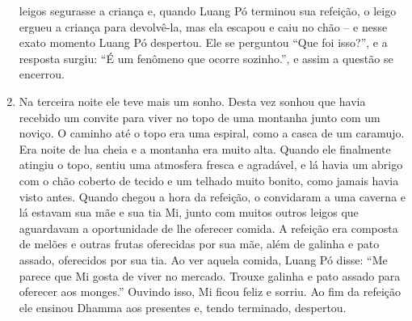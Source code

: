 \begin{enumerate}
  leigos segurasse a criança e, quando Luang Pó terminou sua refeição, o
  leigo ergueu a criança para devolvê-la, mas ela escapou e caiu no chão
  -- e nesse exato momento Luang Pó despertou. Ele se perguntou ``Que
  foi isso?'', e a resposta surgiu: ``É um fenômeno que ocorre
  sozinho.'', e assim a questão se encerrou.
\item
  Na terceira noite ele teve mais um sonho. Desta vez sonhou que havia
  recebido um convite para viver no topo de uma montanha junto com um
  noviço. O caminho até o topo era uma espiral, como a casca de um
  caramujo. Era noite de lua cheia e a montanha era muito alta. Quando
  ele finalmente atingiu o topo, sentiu uma atmosfera fresca e
  agradável, e lá havia um abrigo com o chão coberto de tecido e um
  telhado muito bonito, como jamais havia visto antes. Quando chegou a
  hora da refeição, o convidaram a uma caverna e lá estavam sua mãe e
  sua tia Mi, junto com muitos outros leigos que aguardavam a
  oportunidade de lhe oferecer comida. A refeição era composta de melões
  e outras frutas oferecidas por sua mãe, além de galinha e pato assado,
  oferecidos por sua tia. Ao ver aquela comida, Luang Pó disse: ``Me
  parece que Mi gosta de viver no mercado. Trouxe galinha e pato assado
  para oferecer aos monges.'' Ouvindo isso, Mi ficou feliz e sorriu. Ao
  fim da refeição ele ensinou Dhamma aos presentes e, tendo terminado,
  despertou.
\end{enumerate}
